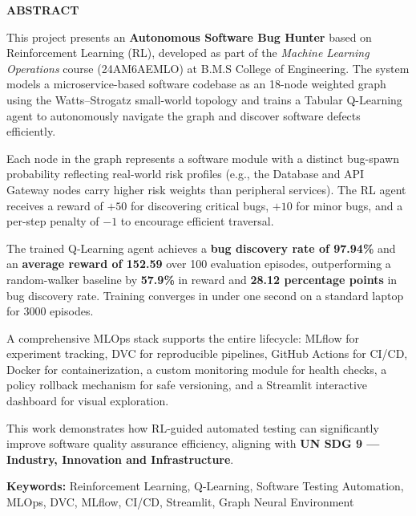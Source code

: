 \documentclass[12pt,a4paper]{report}
\newcommand{\coursecode}{24AM6AEMLO}
\begin{document}
\newpage
\thispagestyle{plain}
\begin{center}
  \textbf{\fontsize{14}{18}\selectfont ABSTRACT}
\end{center}

\vspace{0.4cm}

This project presents an \textbf{Autonomous Software Bug Hunter} based
on Reinforcement Learning (RL), developed as part of the
\textit{Machine Learning Operations} course (\coursecode) at B.M.S
College of Engineering.  The system models a microservice-based software
codebase as an 18-node weighted graph using the Watts--Strogatz small-world
topology and trains a Tabular Q-Learning agent to autonomously navigate
the graph and discover software defects efficiently.

Each node in the graph represents a software module with a distinct
bug-spawn probability reflecting real-world risk profiles (e.g., the
Database and API Gateway nodes carry higher risk weights than peripheral
services).  The RL agent receives a reward of $+50$ for discovering
critical bugs, $+10$ for minor bugs, and a per-step penalty of $-1$ to
encourage efficient traversal.

The trained Q-Learning agent achieves a \textbf{bug discovery rate of
97.94\%} and an \textbf{average reward of 152.59} over 100 evaluation
episodes, outperforming a random-walker baseline by \textbf{57.9\%} in
reward and \textbf{28.12 percentage points} in bug discovery rate.
Training converges in under one second on a standard laptop for 3000
episodes.

A comprehensive MLOps stack supports the entire lifecycle: MLflow for
experiment tracking, DVC for reproducible pipelines, GitHub Actions for
CI/CD, Docker for containerization, a custom monitoring module for health
checks, a policy rollback mechanism for safe versioning, and a Streamlit
interactive dashboard for visual exploration.

This work demonstrates how RL-guided automated testing can significantly
improve software quality assurance efficiency, aligning with
\textbf{UN SDG 9 --- Industry, Innovation and Infrastructure}.

\vspace{1.0cm}

\textbf{Keywords:} Reinforcement Learning, Q-Learning, Software Testing
Automation, MLOps, DVC, MLflow, CI/CD, Streamlit, Graph Neural Environment
\end{document}
